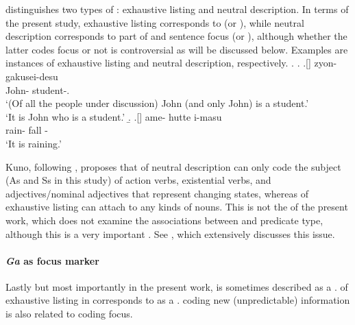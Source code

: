  distinguishes two types of :
exhaustive listing and neutral description.
In terms of the present study,
exhaustive listing corresponds to  (or ),
while neutral description corresponds to part of  and sentence focus (or ),
although whether the latter  codes focus or not is controversial
as will be discussed below.
Examples \Next[a-b] are instances of exhaustive listing and
neutral description, respectively.
%
\ex.
 \a. 
 \bg.[] zyon- gakusei-desu \\
      John- student-. \\
      `(Of all the people under discussion) John (and only John) is a student.' \\
      `It is John who is a student.'
 \b. 
 \bg.[] ame- hutte i-masu \\
      rain- fall - \\
      `It is raining.'
      \hfill{\cite[38]{kuno73}}

Kuno, following ,
proposes that
 of neutral description can only code
the subject (As and Ss in this study) of action verbs,
existential verbs, and
adjectives/nominal adjectives
that represent changing states,
whereas  of exhaustive listing can attach to any kinds of nouns.
This is not the  of the present work,
which does not examine
the associations between  and predicate type,
although this is a very important .
See ,
which extensively discusses this issue.


\paragraph{\textit{Ga} as focus marker}
Lastly but most importantly in the present work,
 is sometimes described as a .
 of exhaustive listing in  corresponds to
 as a  \cite{heycock08}.
 coding new (unpredictable) information \cite[Chapter 25]{kuno73j} is also related to  coding focus.

